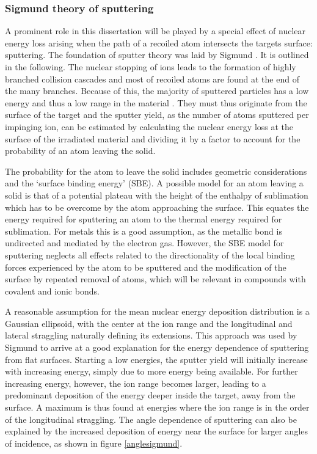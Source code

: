 \subsubsection{Sigmund theory of sputtering}

A prominent role in this dissertation will be played by a special effect of nuclear energy loss arising when the path of a recoiled atom intersects the targets surface: sputtering. The foundation of sputter theory was laid by Sigmund \cite{sigmund_theory_1969}. It is outlined in the following. The nuclear stopping of ions leads to the formation of highly branched collision cascades and most of recoiled atoms are found at the end of the many branches. Because of this, the majority of sputtered particles has a low energy and thus a low range in the material \cite{thompson_energy_1968}. They must thus originate from the surface of the target and the sputter yield, as the number of atoms sputtered per impinging ion, can be estimated by calculating the nuclear energy loss at the surface of the irradiated material and dividing it by a factor to account for the probability of an atom leaving the solid. 

The probability for the atom to leave the solid includes geometric considerations and the `surface binding energy' (SBE). A possible model for an atom leaving a solid is that of a potential plateau with the height of the enthalpy of sublimation which has to be overcome by the atom approaching the surface. This equates the energy required for sputtering an atom to the thermal energy required for sublimation. For metals this is a good assumption, as the metallic bond is undirected and mediated by the electron gas. However, the SBE model for sputtering neglects all effects related to the directionality of the local binding forces experienced by the atom to be sputtered and the modification of the surface by repeated removal of atoms, which will be relevant in compounds with covalent and ionic bonds.  

A reasonable assumption for the mean nuclear energy deposition distribution is a Gaussian ellipsoid, with the center at the ion range and the longitudinal and lateral straggling naturally defining its extensions. This approach was used by Sigmund to arrive at a good explanation for the energy dependence of sputtering from flat surfaces. Starting a low energies, the sputter yield will initially increase with increasing energy, simply due to more energy being available. For further increasing energy, however, the ion range becomes larger, leading to a predominant deposition of the energy deeper inside the target, away from the surface. A maximum is thus found at energies where the ion range is in the order of the longitudinal straggling. The angle dependence of sputtering can also be explained by the increased deposition of energy near the surface for larger angles of incidence, as shown in figure \ref{anglesigmund}.

